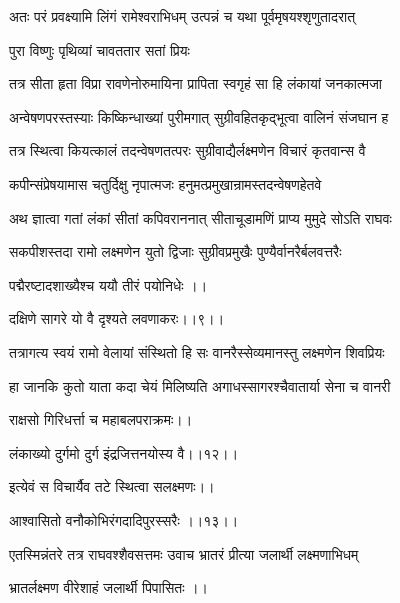 

\textlink{}
\translink{}

\storymeta


\twolineshloka
{अतः परं प्रवक्ष्यामि लिंगं रामेश्वराभिधम्} 
{उत्पन्नं च यथा पूर्वमृषयश्शृणुतादरात्}

\onelineshloka
{पुरा विष्णुः पृथिव्यां चावततार सतां प्रियः} %

\twolineshloka
{तत्र सीता हृता विप्रा रावणेनोरुमायिना} 
{प्रापिता स्वगृहं सा हि लंकायां जनकात्मजा} %

\twolineshloka
{अन्वेषणपरस्तस्याः किष्किन्धाख्यां पुरीमगात्} 
{सुग्रीवहितकृद्भूत्वा वालिनं संजघान ह} %

\twolineshloka
{तत्र स्थित्वा कियत्कालं तदन्वेषणतत्परः} 
{सुग्रीवाद्यैर्लक्ष्मणेन विचारं कृतवान्स वै} %

\twolineshloka
{कपीन्संप्रेषयामास चतुर्दिक्षु नृपात्मजः} 
{हनुमत्प्रमुखान्रामस्तदन्वेषणहेतवे} %

\twolineshloka
{अथ ज्ञात्वा गतां लंकां सीतां कपिवराननात्} 
{सीताचूडामणिं प्राप्य मुमुदे सोऽति राघवः} %

\twolineshloka
{सकपीशस्तदा रामो लक्ष्मणेन युतो द्विजाः} 
{सुग्रीवप्रमुखैः पुण्यैर्वानरैर्बलवत्तरैः} %

पद्मैरष्टादशाख्यैश्च ययौ तीरं पयोनिधेः ।।

दक्षिणे सागरे यो वै दृश्यते लवणाकरः।।९।।

\twolineshloka
{तत्रागत्य स्वयं रामो वेलायां संस्थितो हि सः} 
{वानरैस्सेव्यमानस्तु लक्ष्मणेन शिवप्रियः} %

\twolineshloka
{हा जानकि कुतो याता कदा चेयं मिलिष्यति} 
{अगाधस्सागरश्चैवातार्या सेना च वानरी} %

राक्षसो गिरिधर्त्ता च महाबलपराक्रमः।।

लंकाख्यो दुर्गमो दुर्ग इंद्रजित्तनयोस्य वै।।१२।।

इत्येवं स विचार्यैव तटे स्थित्वा सलक्ष्मणः।।

आश्वासितो वनौकोभिरंगदादिपुरस्सरैः ।।१३।।

\twolineshloka
{एतस्मिन्नंतरे तत्र राघवश्शैवसत्तमः}
{उवाच भ्रातरं प्रीत्या जलार्थी लक्ष्मणाभिधम्} %


भ्रातर्लक्ष्मण वीरेशाहं जलार्थी पिपासितः ।।

